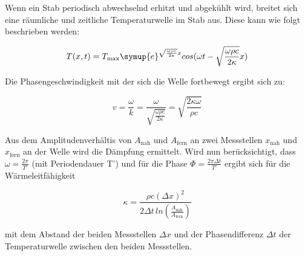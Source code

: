       \noindent Wenn ein Stab periodisch abwechselnd erhitzt und abgekühlt wird, breitet sich eine räumliche und zeitliche Temperaturwelle im Stab aus. 
      Diese kann wie folgt beschrieben werden: 

      \begin{equation}
      T(x,t) = T_\text{max} \symup{e}^{\sqrt{\frac{\omega \rho c}{2 \kappa}}x} cos(\omega t - \sqrt{\frac{\omega \rho c}{2 \kappa}} x)
        \label{eqn:temperaturwelle}
      \end{equation}  

      \noindent Die Phasengeschwindigkeit mit der sich die Welle fortbewegt ergibt sich zu:

      \begin{equation}
      v = \frac{\omega}{k} = \frac{\omega}{\sqrt{\frac{\omega \rho c}{2 \kappa}}} = \sqrt{\frac{2 \kappa \omega}{\rho c}}
        \label{eqn:phasengeschwindigkeit}
      \end{equation}

      \noindent Aus dem Amplitudenverhältis von $A_\text{nah}$ und $A_\text{fern}$ an zwei Messstellen $x_\text{nah}$ und $x_\text{fern}$ an der Welle wird die Dämpfung ermittelt.
      Wird nun berücksichtigt, dass $\omega = \frac{2 \pi}{T'}$ (mit Periodendauer T') und für die Phase $\Phi = \frac{2 \pi \Delta t}{T'}$ ergibt sich für die Wärmeleitfähigkeit

      \begin{equation}
      \kappa = \frac{\rho c (\Delta x)^2}{2 \Delta t \, ln (\frac{A_\text{nah}}{A_\text{fern}})}
        \label{eqn:waermeleitfaehigkeit}
      \end{equation}

     \noindent mit dem Abstand der beiden Messstellen $\Delta x$ und der Phasendifferenz $\Delta t$ der Temperaturwelle zwischen den beiden Messstellen.